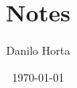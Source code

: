 \documentclass[twocolumn,draft]{article}
\title{Notes}
\author{Danilo Horta}
\date{\today}
\begin{document}
	\maketitle

	\printbibliography\
\end{document}

